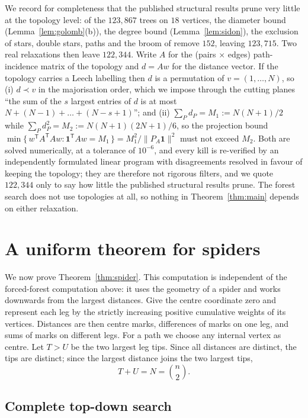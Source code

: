 \documentclass[11pt,a4paper]{article}
\theoremstyle{plain}
\theoremstyle{remark}
\newcommand{\bin}[2]{\binom{#1}{#2}}
\begin{document}
We record for completeness that the published structural results prune very
little at the topology level: of the $123{,}867$ trees on $18$ vertices, the
diameter bound (Lemma~\ref{lem:golomb}(b)), the degree bound
(Lemma~\ref{lem:sidon}), the exclusion of stars, double stars, paths and the
broom of \cite{Varghese2020} remove $152$, leaving $123{,}715$.  Two real
relaxations then leave $122{,}344$.  Write $A$ for the (pairs $\times$ edges)
path-incidence matrix of the topology and $d=Aw$ for the distance vector.  If
the topology carries a Leech labelling then $d$ is a permutation of
$v=(1,\dots,N)$, so (i) $d\prec v$ in the majorisation order, which we impose
through the cutting planes ``the sum of the $s$ largest entries of $d$ is at
most $N+(N-1)+\dots+(N-s+1)$''; and (ii) $\sum_P d_P=M_1:=N(N+1)/2$ while
$\sum_P d_P^2=M_2:=N(N+1)(2N+1)/6$, so the projection bound
$\min\{\,w^{\mathsf T}A^{\mathsf T}Aw : \mathbf 1^{\mathsf T}Aw=M_1\,\}
=M_1^2/\lVert P_A\mathbf 1\rVert^2$ must not exceed $M_2$.  Both are solved
numerically, at a tolerance of $10^{-6}$, and every kill is re-verified by an
independently formulated linear program with disagreements resolved in favour
of keeping the topology; they are therefore not rigorous filters, and we quote
$122{,}344$ only to say how little the published structural results prune.  The
forest search does not use topologies at all, so nothing in
Theorem~\ref{thm:main} depends on either relaxation.

\section{A uniform theorem for spiders}\label{sec:spider}

We now prove Theorem~\ref{thm:spider}.  This computation is independent of the
forced-forest computation above: it uses the geometry of a spider and works
downwards from the largest distances.  Give the centre coordinate zero and
represent each leg by the strictly increasing positive cumulative weights of
its vertices.  Distances are then centre marks, differences of marks on one
leg, and sums of marks on different legs.  For a path we choose any internal
vertex as centre.  Let $T>U$ be the two largest leg tips.  Since all distances
are distinct, the tips are distinct; since the largest distance joins the two
largest tips,
\begin{equation}\label{eq:spideranchor}
  T+U=N=\bin n2.
\end{equation}

\subsection{Complete top-down search}
\end{document}
